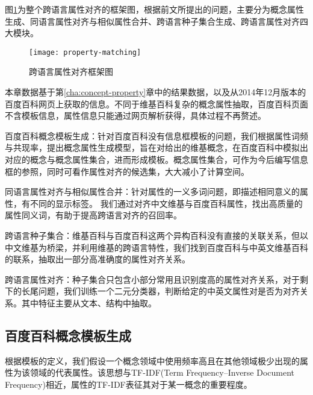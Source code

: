 图\ref{fig:property-matching}为整个跨语言属性对齐的框架图，根据前文所提出的问题，主要分为概念属性生成、同语言属性对齐与相似属性合并、跨语言种子集合生成、跨语言属性对齐四大模块。

\begin{figure}[h]
  \centering
  \texttt{[image: property-matching]}
  \caption{跨语言属性对齐框架图}
  \label{fig:property-matching}
\end{figure}

本章数据基于第\ref{cha:concept-property}章中的结果数据，以及从2014年12月版本的百度百科网页上获取的信息。不同于维基百科复杂的概念属性抽取，百度百科页面不含模板信息，属性信息只能通过网页解析获得，具体过程不再赘述。

{\heiti 百度百科概念模板生成：}针对百度百科没有信息框模板的问题，我们根据属性词频与共现率，提出概念属性生成模型，旨在对给出的维基概念，在百度百科中模拟出对应的概念与概念属性集合，进而形成模板。概念属性集合，可作为今后编写信息框的参照，同时可看作属性对齐的候选集，大大减小了计算空间。

{\heiti 同语言属性对齐与相似属性合并：}针对属性的一义多词问题，即描述相同意义的属性，有不同的显示标签。
我们通过对齐中文维基与百度百科属性，找出高质量的属性同义词，有助于提高跨语言对齐的召回率。

{\heiti 跨语言种子集合：}维基百科与百度百科这两个异构百科没有直接的关联关系，但以中文维基为桥梁，并利用维基的跨语言特性，我们找到百度百科与中英文维基百科的联系，抽取出一部分高准确度的属性对齐关系。

{\heiti 跨语言属性对齐：}种子集合只包含小部分常用且识别度高的属性对齐关系，对于剩下的长尾问题，我们训练一个二元分类器，判断给定的中英文属性对是否为对齐关系。其中特征主要从文本、结构中抽取。

\subsection{百度百科概念模板生成}
\label{sec:domain-template}
根据模板的定义，我们假设一个概念领域中使用频率高且在其他领域极少出现的属性为该领域的代表属性。该思想与TF-IDF(Term Frequency–Inverse Document Frequency)相近，属性的TF-IDF表征其对于某一概念的重要程度。

